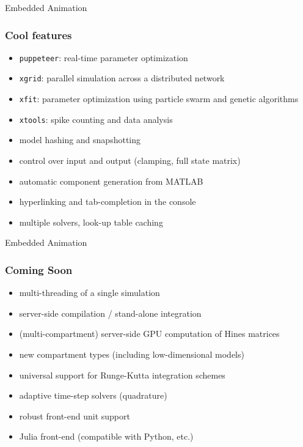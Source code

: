 \documentclass{beamer}
\begin{document}

\begin{frame}{Embedded Animation}
  \frametitle{Cool features}

    \begin{itemize}
      \item \texttt{puppeteer}: real-time parameter optimization
      \item \texttt{xgrid}: parallel simulation across a distributed network
      \item \texttt{xfit}: parameter optimization using particle swarm and genetic algorithms
      \item \texttt{xtools}: spike counting and data analysis
      \item model hashing and snapshotting
      \item control over input and output (clamping, full state matrix)
      \item automatic component generation from MATLAB
      \item hyperlinking and tab-completion in the console
      \item multiple solvers, look-up table caching
    \end{itemize}

\end{frame}


\begin{frame}{Embedded Animation}
  \frametitle{Coming Soon}

    \begin{itemize}
      \item multi-threading of a single simulation
      \item server-side compilation / stand-alone integration
      \item (multi-compartment) server-side GPU computation of Hines matrices
      \item new compartment types (including low-dimensional models)
      \item universal support for Runge-Kutta integration schemes
      \item adaptive time-step solvers (quadrature)
      \item robust front-end unit support
      \item Julia front-end (compatible with Python, etc.)
    \end{itemize}

\end{frame}
\end{document}

